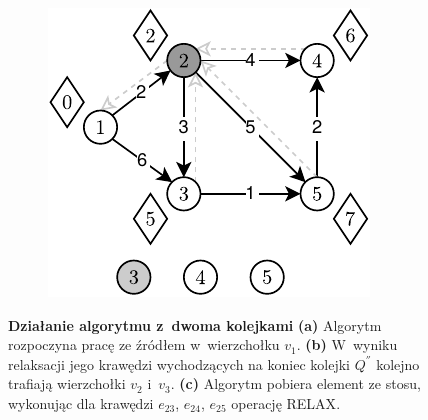 \begin{figure}[!htbp]
\begin{subfigure}[b]{0.3\textwidth}
		\caption{}
	\end{subfigure}
	\quad
	\begin{subfigure}[b]{0.3\textwidth}
		\includegraphics[width=\textwidth]{Chapter_III/GRAPH-GROWTH-2Q-Example/c.pdf}
		\caption{}
	\end{subfigure}
	\caption{\textbf{Działanie algorytmu z~dwoma kolejkami} \textbf{(a)} Algorytm rozpoczyna pracę ze źródłem w~wierzchołku $v_{1}$. \textbf{(b)} W~wyniku relaksacji jego krawędzi wychodzących na koniec kolejki $Q^{''}$ kolejno trafiają wierzchołki $v_{2}$ i~$v_{3}$. \textbf{(c)} Algorytm pobiera element ze stosu, wykonując dla krawędzi $e_{23}$, $e_{24}$, $e_{25}$ operację \textsc{RELAX}. } \label{fig:exampleDQQ1}
\end{figure}

